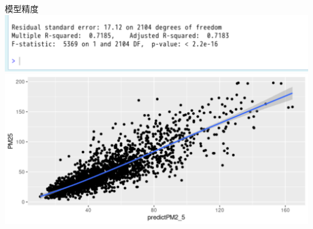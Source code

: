 \documentclass{ctexbeamer}
\begin{document}
\begin{frame}{模型精度}
	\includegraphics[width=\textwidth]{模型精度-R2}
	\includegraphics[width=\textwidth]{模型精度}
\end{frame}
\end{document}
